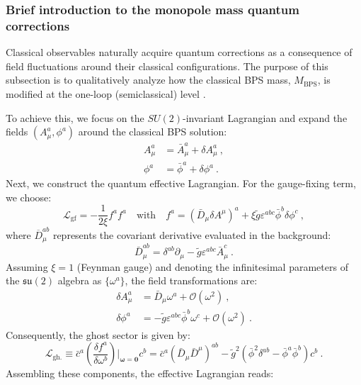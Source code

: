 \documentclass[a4paper,11pt]{article}
\begin{document}
\subsubsection{Brief introduction to the monopole mass quantum corrections}
Classical observables naturally acquire quantum corrections as a consequence of field fluctuations around their classical configurations. The purpose of this subsection is to qualitatively analyze how the classical BPS mass, $M_{\text{BPS}}$, is modified at the one-loop (semiclassical) level \cite{FaddeevKorepin1978}. 

To achieve this, we focus on the $SU(2)$-invariant Lagrangian and expand the fields $(A_{\mu}^{a},\phi^{a})$ around the classical BPS solution:
\begin{align}
    A_\mu^a &= \bar{A}_\mu^a + \delta A_\mu^a\ , \\
    \phi^a &= \bar{\phi}^a + \delta \phi^a\ .
\end{align}
Next, we construct the quantum effective Lagrangian. For the gauge-fixing term, we choose:
\begin{equation}\mathcal{L}_{\text{gf}} = -\frac{1}{2\xi} f^a f^a \quad \text{with} \quad f^a = (\bar{D}_\mu \delta A^\mu)^a + \xi \tilde{g} \varepsilon^{abc} \bar{\phi}^b \delta \phi^c\ , \end{equation}
where $\overline{D}_{\mu}^{ab}$ represents the covariant derivative evaluated in the background:
\begin{equation}
    \bar{D}_\mu^{ab} = \delta^{ab} \partial_\mu - \tilde{g} \varepsilon^{abc} \bar{A}_\mu^c\ .
\end{equation}
Assuming $\xi=1$ (Feynman gauge) and denoting the infinitesimal parameters of the $\mathfrak{su}(2)$ algebra as $\{\omega^{a}\}$, the field transformations are:
\begin{align}
    \delta A_\mu^a &= \bar{D}_\mu \omega^a + \mathcal{O}(\omega^2)\ , \\
    \delta \phi^a &= -\tilde{g} \varepsilon^{abc} \bar{\phi}^b \omega^c + \mathcal{O}(\omega^2)\ .
\end{align}
Consequently, the ghost sector is given by:
\begin{equation}
    \mathcal{L}_{\text{gh.}} \equiv \bar{c}^a \left( \frac{\delta f^a}{\delta \omega^b} \right)\Bigg|_{\boldsymbol\omega=\boldsymbol 0} c^b = \bar{c}^a (\bar{D}_\mu \bar{D}^\mu)^{ab} - \tilde{g}^2 (\bar{\phi}^2 \delta^{ab} - \bar{\phi}^a \bar{\phi}^b) c^b\ .
\end{equation}
Assembling these components, the effective Lagrangian reads:
\end{document}
